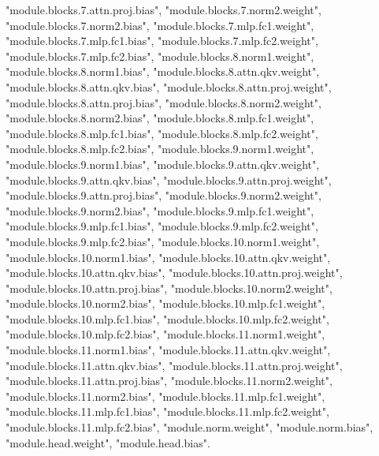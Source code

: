 "module.blocks.7.attn.proj.bias", "module.blocks.7.norm2.weight", "module.blocks.7.norm2.bias", "module.blocks.7.mlp.fc1.weight", "module.blocks.7.mlp.fc1.bias", "module.blocks.7.mlp.fc2.weight", "module.blocks.7.mlp.fc2.bias", "module.blocks.8.norm1.weight", "module.blocks.8.norm1.bias", "module.blocks.8.attn.qkv.weight", "module.blocks.8.attn.qkv.bias", "module.blocks.8.attn.proj.weight", "module.blocks.8.attn.proj.bias", "module.blocks.8.norm2.weight", "module.blocks.8.norm2.bias", "module.blocks.8.mlp.fc1.weight", "module.blocks.8.mlp.fc1.bias", "module.blocks.8.mlp.fc2.weight", "module.blocks.8.mlp.fc2.bias", "module.blocks.9.norm1.weight", "module.blocks.9.norm1.bias", "module.blocks.9.attn.qkv.weight", "module.blocks.9.attn.qkv.bias", "module.blocks.9.attn.proj.weight", "module.blocks.9.attn.proj.bias", "module.blocks.9.norm2.weight", "module.blocks.9.norm2.bias", "module.blocks.9.mlp.fc1.weight", "module.blocks.9.mlp.fc1.bias", "module.blocks.9.mlp.fc2.weight", "module.blocks.9.mlp.fc2.bias", "module.blocks.10.norm1.weight", "module.blocks.10.norm1.bias", "module.blocks.10.attn.qkv.weight", "module.blocks.10.attn.qkv.bias", "module.blocks.10.attn.proj.weight", "module.blocks.10.attn.proj.bias", "module.blocks.10.norm2.weight", "module.blocks.10.norm2.bias", "module.blocks.10.mlp.fc1.weight", "module.blocks.10.mlp.fc1.bias", "module.blocks.10.mlp.fc2.weight", "module.blocks.10.mlp.fc2.bias", "module.blocks.11.norm1.weight", "module.blocks.11.norm1.bias", "module.blocks.11.attn.qkv.weight", "module.blocks.11.attn.qkv.bias", "module.blocks.11.attn.proj.weight", "module.blocks.11.attn.proj.bias", "module.blocks.11.norm2.weight", "module.blocks.11.norm2.bias", "module.blocks.11.mlp.fc1.weight", "module.blocks.11.mlp.fc1.bias", "module.blocks.11.mlp.fc2.weight", "module.blocks.11.mlp.fc2.bias", "module.norm.weight", "module.norm.bias", "module.head.weight", "module.head.bias". 
